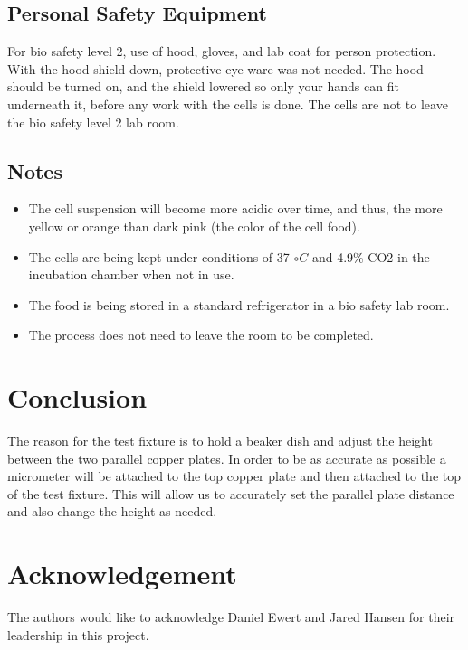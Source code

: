 \documentclass[journal]{IEEEtran}
\begin{document}
\subsection{Personal Safety Equipment}
For bio safety level 2, use of hood, gloves, and lab coat for person protection. With the hood shield down, protective eye ware was not needed. The hood should be turned on, and the shield lowered so only your hands can fit underneath it,  before any work with the cells is done. The cells are not to leave the bio safety level 2 lab room.

\subsection{Notes}
\begin{itemize}
\item The cell suspension will become more acidic over time, and thus, the more yellow or orange than dark pink (the color of the cell food).
\item The cells are being kept under conditions of 37 $\circ C$ and 4.9\% CO2 in the incubation chamber when not in use. 
\item The food is being stored in a standard refrigerator in a bio safety lab room.
\item The process does not need to leave the room to be completed.
\end{itemize}

\section{Conclusion}
The reason for the test fixture is to hold a beaker dish and  adjust the height between the two parallel copper plates. In order to be as accurate as possible a micrometer will be attached to the top copper plate and then attached to the top of the test fixture. This will allow us to accurately set the parallel plate distance and also change the height as needed. 

\section{Acknowledgement}
The authors would like to acknowledge Daniel Ewert and Jared Hansen for their leadership in this project.
\end{document}
